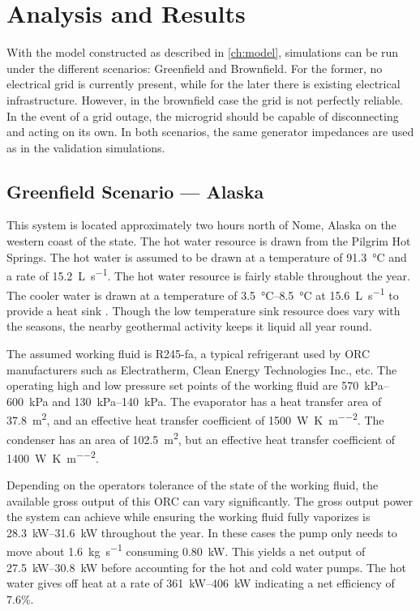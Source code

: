 \chapter{Analysis and Results}
\label{ch:analysis}

With the model constructed as described in \autoref{ch:model}, simulations can be run under the different scenarios: Greenfield and Brownfield. For the former, no electrical grid is currently present, while for the later there is existing electrical infrastructure. However, in the brownfield case the grid is not perfectly reliable. In the event of a grid outage, the microgrid should be capable of disconnecting and acting on its own. In both scenarios, the same generator impedances are used as in the validation simulations. 

\section{Greenfield Scenario --- Alaska}
This system is located approximately two hours north of Nome, Alaska on the western coast of the state. The hot water resource is drawn from the Pilgrim Hot Springs. The hot water is assumed to be drawn at a temperature of \SI{91.3}{\degreeCelsius} and a rate of \SI{15.2}{\liter\per\second}. The hot water resource is fairly stable throughout the year. The cooler water is drawn at a temperature of \SIrange{3.5}{8.5}{\degreeCelsius} at \SI{15.6}{\liter\per\second} to provide a heat sink \cite{Haselwimmer2013, AlaskaCenterforEnergyandPower2014}. Though the low temperature sink resource does vary with the seasons, the nearby geothermal activity keeps it liquid all year round.

The assumed working fluid is R245-fa, a typical refrigerant used by ORC manufacturers such as Electratherm, Clean Energy Technologies Inc., etc. The operating high and low pressure set points of the working fluid are \SIrange{570}{600}{\kilo\pascal} and \SIrange{130}{140}{\kilo\pascal}. The evaporator has a heat transfer area of \SI{37.8}{\meter\squared}, and an effective heat transfer coefficient of \SI{1500}{\watt\per\kelvin\per\meter\squared}. The condenser has an area of \SI{102.5}{\meter\squared}, but an effective heat transfer coefficient of \SI{1400}{\watt\per\kelvin\per\meter\squared}.

Depending on the operators tolerance of the state of the working fluid, the available gross output of this ORC can vary significantly. The gross output power the system can achieve while ensuring the working fluid fully vaporizes is \SIrange{28.3}{31.6}{\kilo\watt} throughout the year. In these cases the pump only needs to move about \SI{1.6}{\kilogram\per\second} consuming \SI{0.80}{\kilo\watt}. This yields a net output of \SIrange{27.5}{30.8}{\kilo\watt} before accounting for the hot and cold water pumps. The hot water gives off heat at a rate of \SIrange{361}{406}{\kilo\watt} indicating a net efficiency of 7.6\%.

